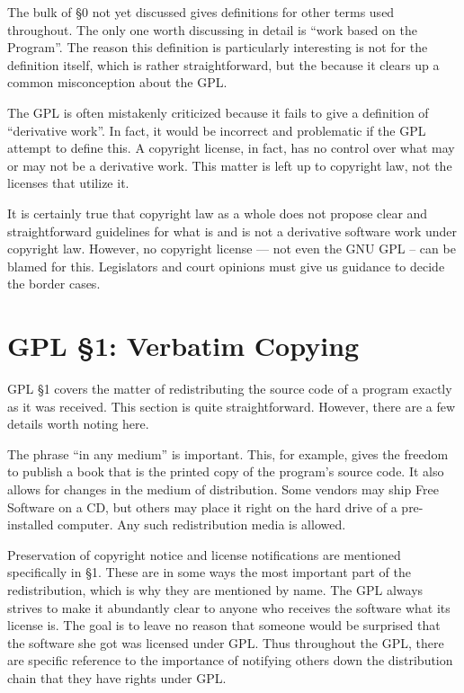 \documentclass[12pt]{report}
\begin{document}
\medskip

The bulk of \S 0 not yet discussed gives definitions for other terms used
throughout.  The only one worth discussing in detail is ``work based on
the Program''.  The reason this definition is particularly interesting is
not for the definition itself, which is rather straightforward, but the
because it clears up a common misconception about the GPL\@.

The GPL is often mistakenly criticized because it fails to give a
definition of ``derivative work''.  In fact, it would be incorrect and
problematic if the GPL attempt to define this.  A copyright license, in
fact, has no control over what may or may not be a derivative work.  This
matter is left up to copyright law, not the licenses that utilize it.

It is certainly true that copyright law as a whole does not propose clear
and straightforward guidelines for what is and is not a derivative
software work under copyright law.  However, no copyright license --- not
even the GNU GPL -- can be blamed for this.  Legislators and court
opinions must give us guidance to decide the border cases.

\section{GPL \S 1: Verbatim Copying}

GPL \S 1 covers the matter of redistributing the source code of a program
exactly as it was received.  This section is quite straightforward.
However, there are a few details worth noting here.

The phrase ``in any medium'' is important.  This, for example, gives the
freedom to publish a book that is the printed copy of the program's source
code.  It also allows for changes in the medium of distribution.  Some
vendors may ship Free Software on a CD, but others may place it right on
the hard drive of a pre-installed computer.  Any such redistribution media
is allowed.

Preservation of copyright notice and license notifications are mentioned
specifically in \S 1.  These are in some ways the most important part of
the redistribution, which is why they are mentioned by name.  The GPL
always strives to make it abundantly clear to anyone who receives the
software what its license is.  The goal is to leave no reason that someone
would be surprised that the software she got was licensed under GPL\@.
Thus throughout the GPL, there are specific reference to the importance of
notifying others down the distribution chain that they have rights under
GPL.
\end{document}
